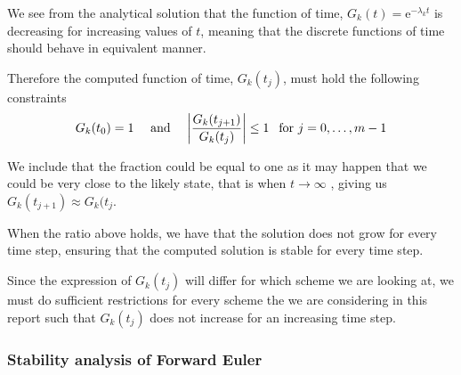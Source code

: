 \documentclass[12pt,english,a4paper]{article}
\renewcommand{\exp}[1]{\mathrm{e}^{#1}}
\begin{document}
We see from the analytical solution that the function of time, \(G_k(t) = \exp{-\lambda_k t}\) is decreasing for increasing values of \(t\), meaning that the discrete functions of time should behave in equivalent manner.

Therefore the computed function of time, \(G_k(t_j)\), must hold the following constraints
\[
G_k(t_{0}) = 1 \quad \text{ and }\quad \abs{\frac{G_k(t_{j+1}) } {G_k(t_j) } }\leq 1 \:\:\text{ for } j = 0, \dots,m-1
\]

We include that the fraction could be equal to one as it may happen that we could be very close to the likely state, that is when \(t \to \infty \)  , giving us \( G_k(t_{j+1}) \approx G_k(t_{j} \).

When the ratio above holds, we have that the solution does not grow for every time step, ensuring that the computed solution is stable for every time step.

Since the expression of \(G_k(t_{j})\) will differ for which scheme we are looking at, we must do sufficient restrictions for every scheme the we are considering in this report such that \(G_k(t_{j})\) does not increase for an increasing time step.
\subsubsection{Stability analysis of Forward Euler}\label{forwardstability}
\end{document}

